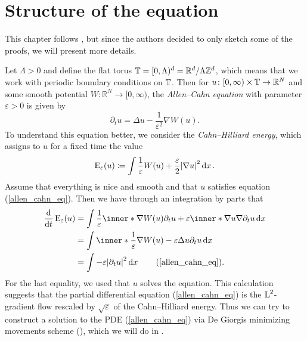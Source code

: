 \section{Structure of the equation}

This chapter follows 
\cite{convergence_of_allen_cahn_equation_to_multiphase_mean_curvature_flow}, 
but since the authors decided to only sketch some of the proofs, we will 
present more details.

Let $ \Lambda > 0 $ and define the flat torus 
$ \operatorname{\mathbb{T}} = [0, \Lambda )^{ d } = \mathbb{ R }^{ d } / \Lambda \mathbb{ Z 
}^{ d } $, 
which means that we work with periodic boundary conditions on $ \operatorname{\mathbb{T}} $.
Then for 
$ u \colon [ 0 , \infty ) \times \operatorname{\mathbb{T}} \to \mathbb{ R }^{ N } $ 
and some smooth potential 
$ W \colon \mathbb{ R }^{ N } \to [0, \infty ) $,
the \emph{Allen--Cahn equation} with parameter $ \varepsilon > 0 $ is given by
\begin{equation}
	\label{allen_cahn_eq}
	\partial_{ t } u 
	=
	\Delta u - \frac{1 }{ \varepsilon^{ 2 } } \nabla W ( u ).
\end{equation}
To understand this equation better, we consider the \emph{Cahn--Hilliard 
energy}, which assigns to $ u $ for a fixed time the value
\begin{equation}
	\label{cahn_hilliard_energy}
	\operatorname{E}_{ \varepsilon } 
	(u)
	\coloneqq
	\int
	\frac{ 1 }{ \varepsilon }
	W ( u )
	+
	\frac{ \varepsilon }{ 2 }
	\abs{ \nabla u }^{ 2 }
	\dd{x}.
\end{equation}
Assume that everything is nice and smooth and that
$ u $ satisfies 
equation (\ref{allen_cahn_eq}). Then we have through an integration by parts 
that
\begin{align*}
	\dv{t} \energy_{ \varepsilon } ( u )
	&=
	\int
	\frac{ 1 }{ \varepsilon }
	\inner*{\nabla W ( u )}{ \partial_{ t } u}
	+
	\varepsilon
	\inner*{\nabla u}{ \nabla \partial_{ t } u}
	\dd{x}
	\\
	&=
	\int
	\inner*{ \frac{ 1 }{\varepsilon } \nabla W ( u ) - \varepsilon \Delta u  }{ \partial_{ t } u }
	\dd{x}
	\\
	&=
	\int - \varepsilon \abs{ \partial_{ t } u }^{ 2 } \dd{ x }
	\tag{\ref{allen_cahn_eq}}.
\end{align*}
For the last equality, we used that $ u $ solves the equation.
This calculation suggests that the partial differential equation 
(\ref{allen_cahn_eq}) is the $ \operatorname{L}^{ 2 } $-gradient flow rescaled by $ 
\sqrt{\varepsilon} $ of the Cahn--Hilliard 
energy. Thus we can try to construct a solution to the PDE 
(\ref{allen_cahn_eq}) via De Giorgis minimizing movements scheme 
(\cite{de_giorgi_new_problems_on_minimizing_movements}), which we will do in 
.

